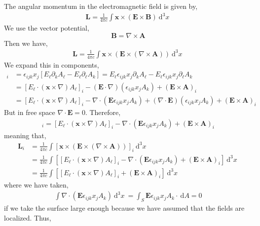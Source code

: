 \documentclass[12pt]{extarticle}
\renewcommand{\d}[1]{\: \mathrm{d}#1}
\newcommand{\dn}[2]{\: \mathrm{d}^{#1} #2 \:}
\renewcommand{\bf}[1]{\mathbf{#1}}
\theoremstyle{definition}
\begin{document}
The angular momentum in the electromagnetic field is given by,
\begin{align*}
\bf{L} = \frac{1}{4 \pi c} \int \bf{x} \times (\bf{E} \times \bf{B}) \dn{3}{x}
\end{align*}
We use the vector potential,
\[ \bf{B} = \nabla \times \bf{A} \]
Then we have,
\begin{align*}
\bf{L} = \frac{1}{4 \pi c} \int \bf{x} \times (\bf{E} \times (\nabla \times \bf{A})) \dn{3}{x}
\end{align*}
We expand this in components,
\begin{align*}
[\bf{x} \times (\bf{E} \times (\nabla \times \bf{A}))]_i & = \epsilon_{ijk} x_j [E_{\ell} \partial_k A_{\ell} - E_{\ell} \partial_{\ell} A_k] = E_{\ell} \epsilon_{ijk} x_j \partial_k A_{\ell} - E_{\ell} \epsilon_{ijk} x_j \partial_{\ell} A_k
\\
& = [E_{\ell} \cdot (\bf{x} \times \nabla) A_{\ell}]_i - (\bf{E} \cdot \nabla) (\epsilon_{ijk} x_j A_k) + (\bf{E} \times \bf{A})_i
\\
& = [E_{\ell} \cdot (\bf{x} \times \nabla) A_{\ell}]_i - \nabla \cdot (\bf{E} \epsilon_{ijk} x_j A_k) + (\nabla \cdot \bf{E}) (\epsilon_{ijk} x_j A_k) + (\bf{E} \times \bf{A})_i
\end{align*}
But in free space $\nabla \cdot \bf{E} = 0$. Therefore,
\begin{align*}
[\bf{x} \times (\bf{E} \times (\nabla \times \bf{A}))]_i = [E_{\ell} \cdot (\bf{x} \times \nabla) A_{\ell}]_i - \nabla \cdot (\bf{E} \epsilon_{ijk} x_j A_k) + (\bf{E} \times \bf{A})_i
\end{align*}
meaning that,
\begin{align*}
\bf{L}_i & = \frac{1}{4 \pi c} \int [\bf{x} \times (\bf{E} \times (\nabla \times \bf{A}))]_i \dn{3}{x}
\\
& = \frac{1}{4 \pi c} \int \left[ [E_{\ell} \cdot (\bf{x} \times \nabla) A_{\ell}]_i - \nabla \cdot (\bf{E} \epsilon_{ijk} x_j A_k) + (\bf{E} \times \bf{A})_i \right] \dn{3}{x} 
\\
& = \frac{1}{4 \pi c} \int \left[ [E_{\ell} \cdot (\bf{x} \times \nabla) A_{\ell}]_i + (\bf{E} \times \bf{A})_i \right] \dn{3}{x} 
\end{align*}
where we have taken,
\begin{align*}
\int \nabla \cdot (\bf{E} \epsilon_{ijk} x_j A_k) \dn{3}{x} = \int_S \bf{E} \epsilon_{ijk} x_j A_k \cdot \d{A} = 0
\end{align*}
if we take the surface large enough because we have assumed that the fields are localized. Thus,
\end{document}
